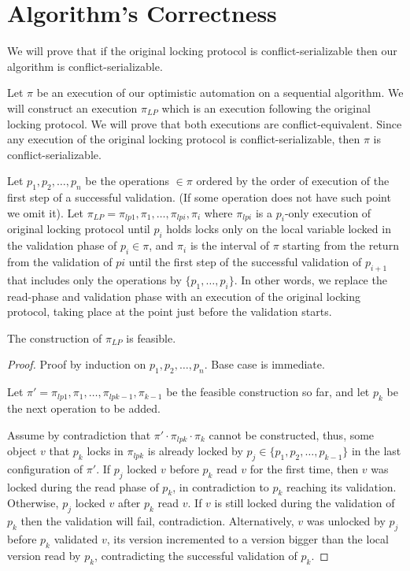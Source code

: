 \section{Algorithm's Correctness} \label{sec:proof}
We will prove that if the original locking protocol is 
conflict-serializable then our algorithm is conflict-serializable.

Let $\pi$ be an execution of our optimistic automation on a 
sequential algorithm. We will construct an execution $\pi_{LP}$ 
which is an execution following the original locking protocol. 
We will prove that both executions are conflict-equivalent. 
Since any execution of the original locking protocol
is conflict-serializable, then $\pi$ is conflict-serializable. 

Let $p_1,p_2,\ldots,p_n$ be the operations $\in\pi$ ordered by the 
order of execution of the first step of a successful \readSet 
validation. (If some operation does not have such point we omit it).
Let $\pi_{LP} = \pi_{lp1},\pi_{1},\ldots,\pi_{lpi},\pi_{i}$ where 
$\pi_{lpi}$ is a $p_i$-only execution of original locking protocol 
until $p_i$ holds locks only on the local variable locked
in the validation phase of $p_i \in \pi$, and $\pi_i$ is
the interval of $\pi$ starting from the return from the validation of
$pi$ until the first step of the successful \readSet validation of 
$p_{i+1}$ that includes only the operations by $\{p_1,\ldots,p_i\}$.
In other words, we replace the read-phase and validation phase with 
an execution of the original locking protocol, 
taking place at the point just before the \readSet validation starts. 

\begin{lemma}
The construction of $\pi_{LP}$ is feasible.  
\end{lemma}
\begin{proof}
Proof by induction on $p_1,p_2,\ldots,p_n$. Base case is immediate. 

Let $\pi' = \pi_{lp1},\pi_{1},\ldots,\pi_{lpk-1},\pi_{k-1}$ be the feasible
construction so far, and let $p_{k}$ be the next operation to be 
added. 

Assume by contradiction that $\pi'\cdot\pi_{lpk}\cdot\pi_{k}$ 
cannot be constructed, thus, some object $v$ that $p_{k}$ locks 
in $\pi_{lpk}$ is already locked 
by $p_j \in \{p_1,p_2,\ldots,p_{k-1}\}$ in
the last configuration of $\pi'$. 
If $p_j$ locked $v$ before $p_k$ read $v$ for the first time, 
then $v$ was locked during the read phase of $p_k$, 
in contradiction to $p_k$ reaching its validation. 
Otherwise, $p_j$ locked $v$ after $p_k$ read $v$. 
If $v$ is still locked during the validation of $p_k$ then 
the validation will fail, contradiction. Alternatively, $v$ 
was unlocked by $p_j$ before $p_k$ validated $v$, 
its version incremented to a version bigger 
than the local version read by $p_k$, 
contradicting the successful validation of $p_k$.  
\end{proof}

